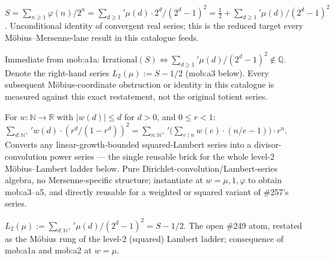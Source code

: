 \begin{prop}
$S = \sum_{n\ge1} \varphi(n)/2^n = \sum_{d\ge1}' \mu(d)\cdot 2^d/(2^d-1)^2 = \tfrac12 + \sum_{d\ge1}' \mu(d)/(2^d-1)^2$. Unconditional identity of convergent real series; this is the reduced target every M\"obius--Mersenne-lane result in this catalogue feeds.
\par\noindent{}     
\end{prop}

\begin{cor}
Immediate from mob:a1a: $\mathrm{Irrational}(S) \iff \sum_{d\ge1}' \mu(d)/(2^d-1)^2 \notin \mathbb{Q}$. Denote the right-hand series $L_2(\mu) := S - 1/2$ (mob:a3 below). Every subsequent M\"obius-coordinate obstruction or identity in this catalogue is measured against this exact restatement, not the original totient series.
\par\noindent{}   
\end{cor}

\begin{prop}
For $w:\mathbb{N}\to\mathbb{R}$ with $|w(d)| \le d$ for $d>0$, and $0 \le r < 1$: $\sum_{d:\mathbb{N}^+}' w(d)\cdot(r^d/(1-r^d))^2 = \sum_{n:\mathbb{N}^+}' \Big(\sum_{e\mid n} w(e)\cdot(n/e-1)\Big)\cdot r^n$. Converts any linear-growth-bounded squared-Lambert series into a divisor-convolution power series — the single reusable brick for the whole level-2 M\"obius--Lambert ladder below. Pure Dirichlet-convolution/Lambert-series algebra, no Mersenne-specific structure; instantiate at $w = \mu, 1, \varphi$ to obtain mob:a3--a5, and directly reusable for a weighted or squared variant of \#257's series.
\par\noindent{}   
\end{prop}

\begin{defn}
$L_2(\mu) := \sum_{d:\mathbb{N}^+}' \mu(d)/(2^d-1)^2 = S - 1/2$. The open \#249 atom, restated as the M\"obius rung of the level-2 (squared) Lambert ladder; consequence of mob:a1a and mob:a2 at $w=\mu$.
\par\noindent{}   
\end{defn}

